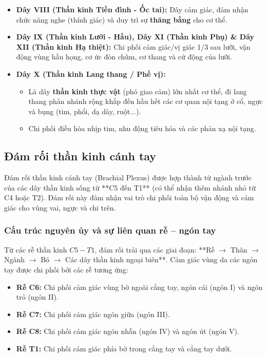 \begin{itemize}
    \item \textbf{Dây VIII (Thần kinh Tiền đình - Ốc tai):} Dây cảm giác, đảm nhận chức năng nghe (thính giác) và duy trì sự \textbf{thăng bằng} cho cơ thể.

    \item \textbf{Dây IX (Thần kinh Lưỡi - Hầu), Dây XI (Thần kinh Phụ) \& Dây XII (Thần kinh Hạ thiệt):} Chi phối cảm giác/vị giác 1/3 sau lưỡi, vận động vùng hầu họng, cơ ức đòn chũm, cơ thang và cử động của lưỡi.

    \item \textbf{Dây X (Thần kinh Lang thang / Phế vị):} 
    \begin{itemize}
        \item Là dây \textbf{thần kinh thực vật} (phó giao cảm) lớn nhất cơ thể, đi lang thang phân nhánh rộng khắp đến hầu hết các cơ quan nội tạng ở cổ, ngực và bụng (tim, phổi, dạ dày, ruột...).
        \item Chi phối điều hòa nhịp tim, nhu động tiêu hóa và các phản xạ nội tạng.
    \end{itemize}
\end{itemize}
\subsection{Đám rối thần kinh cánh tay}

Đám rối thần kinh cánh tay (Brachial Plexus) được hợp thành từ ngành trước của các dây thần kinh sống từ **C5 đến T1** (có thể nhận thêm nhánh nhỏ từ C4 hoặc T2). Đám rối này đảm nhận vai trò chi phối toàn bộ vận động và cảm giác cho vùng vai, ngực và chi trên.

\subsubsection{Cấu trúc nguyên ủy và sự liên quan rễ -- ngón tay}

Từ các rễ thần kinh $C5 - T1$, đám rối trải qua các giai đoạn: **Rễ $\rightarrow$ Thân $\rightarrow$ Ngành $\rightarrow$ Bó $\rightarrow$ Các dây thần kinh ngoại biên**. Cảm giác vùng da các ngón tay được chi phối bởi các rễ tương ứng:
\begin{itemize}
    \item \textbf{Rễ C6:} Chi phối cảm giác vùng bờ ngoài cẳng tay, ngón cái (ngón I) và ngón trỏ (ngón II).
    \item \textbf{Rễ C7:} Chi phối cảm giác ngón giữa (ngón III).
    \item \textbf{Rễ C8:} Chi phối cảm giác ngón nhẫn (ngón IV) và ngón út (ngón V).
    \item \textbf{Rễ T1:} Chi phối cảm giác phía bờ trong cẳng tay và cẳng tay dưới.
\end{itemize}

